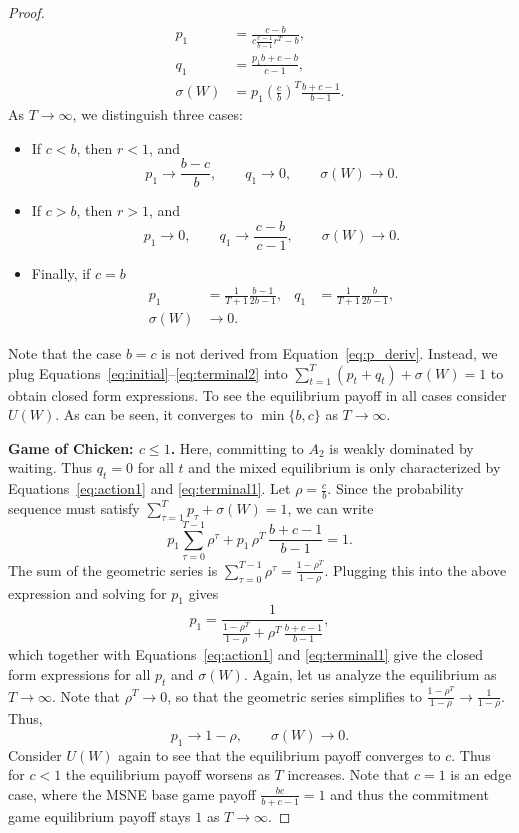 \documentclass[letterpaper]{article}
\newcommand{\bparam}{b}
\newcommand{\cparam}{c}
\theoremstyle{definition}
\begin{document}
\begin{proof}
\begin{align*}
p_1 &= \frac{\cparam - \bparam}
{\cparam \frac{\cparam-1}{\bparam-1}r^T-\bparam},\\
q_1 &= \frac{p_1 \bparam + \cparam - \bparam}{\cparam - 1},\\
\sigma(W) &= p_1\left(\frac{\cparam}{\bparam}\right)^T
\frac{\bparam + \cparam - 1}{\bparam-1}.
\end{align*}
As $T\to\infty$, we distinguish three cases:
\begin{itemize}
    \item If $\cparam<\bparam$, then $r<1$, and
    \[
    p_1 \to \frac{\bparam-\cparam}{\,\bparam},\qquad q_1 \to 0,\qquad \sigma(W) \to 0.
    \]
    \item If $\cparam>\bparam$, then $r>1$, and
    \[
    p_1 \to 0,\qquad q_1 \to \frac{\cparam-\bparam}{\,\cparam-1},\qquad \sigma(W) \to 0.
    \]
    \item Finally, if $\cparam=\bparam$
    \[
    \begin{aligned}
    p_1&=\frac{1}{T+1}\frac{\bparam-1}{2\bparam-1},&
    q_1&=\frac{1}{T+1}\frac{\bparam}{2\bparam-1},\\
    \sigma(W)&\to 0.
    \end{aligned}
    \]
\end{itemize}
Note that the case $\bparam=\cparam$ is not derived from Equation~\eqref{eq:p_deriv}. Instead, we plug Equations~\eqref{eq:initial}--\eqref{eq:terminal2} into $\sum_{t=1}^T(p_t+q_t)+\sigma(W)=1$ to obtain closed form expressions. To see the equilibrium payoff in all cases consider $U(W)$. As can be seen, it converges to $\min\{\bparam,\cparam\}$ as $T\to\infty$.

\textbf{Game of Chicken: $\cparam\leq1$.}
Here, committing to $A_2$ is weakly dominated by waiting. Thus $q_t=0$ for all $t$ and the mixed equilibrium is only characterized by Equations~\eqref{eq:action1} and \eqref{eq:terminal1}.
Let $\rho=\frac{\cparam}{\bparam}$. Since the probability sequence must satisfy $ \sum_{\tau=1}^{T} p_\tau + \sigma(W) = 1 $, we can write
$$
p_1\sum_{\tau=0}^{T-1} \rho^\tau + p_1\,\rho^{T}\,\frac{\bparam+\cparam-1}{\bparam-1} = 1.
$$
The sum of the geometric series is $\sum_{\tau=0}^{T-1} \rho^\tau = \frac{1-\rho^{T}}{1-\rho}$. Plugging this into the above expression and solving for $p_1$ gives
\[
p_1 = \frac{1}{\frac{1-\rho^{T}}{1-\rho} + \rho^{T}\,\frac{\bparam+\cparam-1}{\bparam-1}},
\]
which together with Equations~\eqref{eq:action1} and \eqref{eq:terminal1} give the closed form expressions for all $p_t$ and $\sigma(W)$.
Again, let us analyze the equilibrium as $T\to\infty$. Note that $\rho^{T}\to 0$, so that the geometric series simplifies to $\frac{1-\rho^{T}}{1-\rho}\to \frac{1}{1-\rho}$. Thus,
\[
p_1\to 1-\rho,\qquad \sigma(W) \to 0.
\]
Consider $U(W)$ again to see that the equilibrium payoff converges to $\cparam$. Thus for $\cparam<1$ the equilibrium payoff worsens as $T$ increases. Note that $\cparam=1$ is an edge case, where the MSNE base game payoff $\frac{\bparam\cparam}{\bparam+\cparam-1}=1$ and thus the commitment game equilibrium payoff stays $1$ as $T\to\infty$. 

\end{proof}
\end{document}
